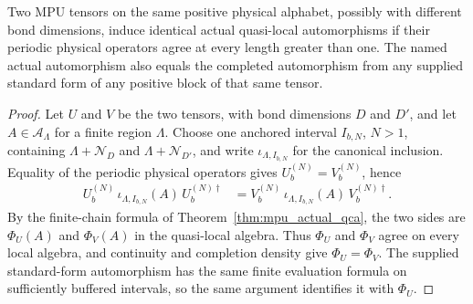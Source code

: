 \begin{lemma}
    \label{lem:mpu_actual_qca_family_independence}
    \leanok
    Two MPU tensors on the same positive physical alphabet, possibly
    with different bond dimensions, induce identical actual quasi-local
    automorphisms if their periodic physical operators agree at every
    length greater than one. The named actual automorphism also equals
    the completed automorphism from any supplied standard form of any
    positive block of that same tensor.
\end{lemma}
\begin{proof}
    \leanok
    Let $U$ and $V$ be the two tensors, with bond dimensions $D$ and
    $D'$, and let $A\in\mathcal A_\Lambda$ for a finite region
    $\Lambda$. Choose one anchored interval $I_{b,N}$, $N>1$, containing
    $\Lambda+\mathcal N_D$ and $\Lambda+\mathcal N_{D'}$, and write
    $\iota_{\Lambda,I_{b,N}}$ for the canonical inclusion. Equality of
    the periodic physical operators gives $U_b^{(N)}=V_b^{(N)}$, hence
    \begin{align}
        U_b^{(N)}\,\iota_{\Lambda,I_{b,N}}(A)\,U_b^{(N)\dagger}
         & =V_b^{(N)}\,\iota_{\Lambda,I_{b,N}}(A)\,V_b^{(N)\dagger}.
    \end{align}
    By the finite-chain formula of Theorem~\ref{thm:mpu_actual_qca},
    the two sides are $\Phi_U(A)$ and $\Phi_V(A)$ in the quasi-local
    algebra. Thus $\Phi_U$ and $\Phi_V$ agree on every local algebra,
    and continuity and completion density give $\Phi_U=\Phi_V$. The
    supplied standard-form automorphism has the same finite evaluation
    formula on sufficiently buffered intervals, so the same argument
    identifies it with $\Phi_U$.
\end{proof}


